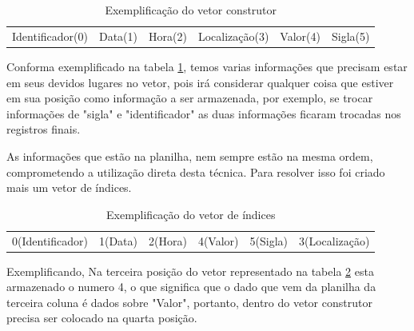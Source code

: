 \begin{table}[h!]
\centering
\caption{Exemplificação do vetor construtor}\label{tabelaExemploConstrutor}
\begin{tabular}{ l | c | c | c | c | r }
Identificador(0) & Data(1) & Hora(2) & Localização(3) & Valor(4) & Sigla(5)
\end{tabular}
\end{table}

Conforma exemplificado na tabela \ref{tabelaExemploConstrutor}, temos varias informações que precisam estar em seus devidos lugares no vetor, pois irá considerar qualquer coisa que estiver em sua posição como informação a ser armazenada, por exemplo, se trocar informações de "sigla" e "identificador" as duas informações ficaram trocadas nos registros finais.

As informações que estão na planilha, nem sempre estão na mesma ordem, comprometendo a utilização direta desta técnica. Para resolver isso foi criado mais um vetor de índices.

\begin{table}[h!]
\centering
\caption{Exemplificação do vetor de índices}\label{tabelaExemploIndices}
\begin{tabular}{ l | c | c | c | c | r }
0(Identificador) & 1(Data) & 2(Hora) & 4(Valor) & 5(Sigla) & 3(Localização)
\end{tabular}
\end{table}

Exemplificando, Na terceira posição do vetor representado na tabela \ref{tabelaExemploIndices} esta armazenado o numero 4, o que significa que o dado que vem da planilha da terceira coluna é dados sobre "Valor", portanto, dentro do vetor construtor precisa ser colocado na quarta posição.